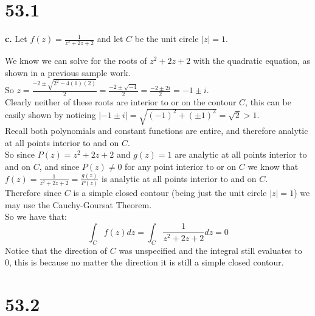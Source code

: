 \documentclass{article}
\begin{document}
\newpage
\section*{53.1}

{\Large\textbf{c.}} Let $f(z) =\frac{1}{z^2 + 2z + 2}$ and let $C$ be the unit circle $|z| = 1$.
\begin{center}
    \doublespacing
    We know we can solve for the roots of $z^2 + 2z + 2$ with the quadratic equation, as shown in a previous sample work.
    \\So $z =\frac{-2\pm\sqrt{2^2 - 4(1)(2)}}{2} =\frac{-2\pm\sqrt{-4}}{2} =\frac{-2\pm 2i}{2} = -1\pm i$.
    \\Clearly neither of these roots are interior to or on the contour $C$, this can be easily shown by noticing $|-1\pm i| =\sqrt{(-1)^2 + (\pm 1)^2} =\sqrt{2} > 1$.
    \\Recall both polynomials and constant functions are entire, and therefore analytic at all points interior to and on $C$.
    \break
    \\So since $P(z) = z^2 + 2z + 2$ and $g(z) = 1$ are analytic at all points interior to and on $C$, and since $P(z)\neq 0$ for any point interior to or on $C$ we know that $f(z) =\frac{1}{z^2 + 2z + 2} =\frac{g(z)}{P(z)}$ is analytic at all points interior to and on $C$.
    \\Therefore since $C$ is a simple closed contour (being just the unit circle $|z| = 1$) we may use the Cauchy-Goursat Theorem.
    \\So we have that:
    \[\int _C f(z) dz =\int _C\frac{1}{z^2 + 2z + 2} dz = 0\]
    Notice that the direction of $C$ was unspecified and the integral still evaluates to 0, this is because no matter the direction it is still a simple closed contour.
    \\ \qedsymbol
\end{center}


\newpage
\section*{53.2}
\end{document}
